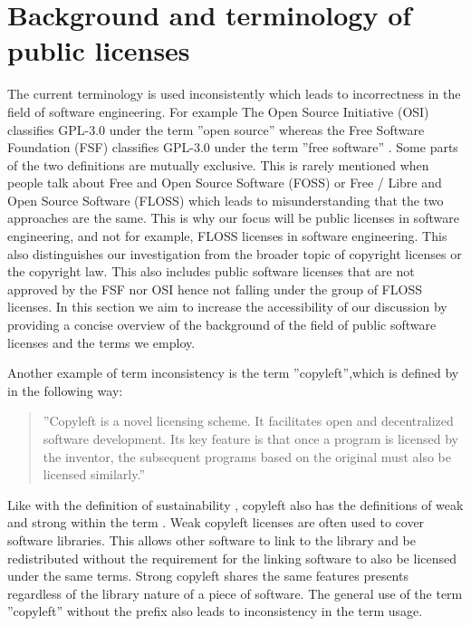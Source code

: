\section{Background and terminology of public licenses\label{sec:bg}}
The current terminology is used inconsistently which leads to incorrectness in the field of software engineering. For example The Open Source Initiative (OSI) classifies GPL-3.0 under the term ''open source'' whereas the Free Software Foundation (FSF) classifies GPL-3.0 under the term ''free software'' \citep{osi:gplv3}\citep{rms:opensource}. Some parts of the two definitions are mutually exclusive. This is rarely mentioned when people talk about Free and Open Source Software (FOSS) or Free / Libre and Open Source Software (FLOSS) which leads to misunderstanding that the two approaches are the same. This is why our focus will be public licenses in software engineering, and not for example, FLOSS licenses in software engineering. This also distinguishes our investigation from the broader topic of copyright licenses or the copyright law. This also includes public software licenses that are not approved by the FSF nor OSI hence not falling under the group of FLOSS licenses. In this section we aim to increase the accessibility of our discussion by providing a concise overview of the background of the field of public software licenses and the terms we employ.

Another example of term inconsistency is the term ''copyleft'',which is defined by \cite{mustonen2003} in the following way:
\begin{quote}
	''Copyleft is a novel licensing scheme. It facilitates open and decentralized software development. Its key feature is that once a program is licensed by the inventor, the subsequent programs based on the original must also be licensed similarly.''
\end{quote}
Like with the definition of sustainability \citep{weak-sustainability}, copyleft also has the definitions of weak and strong within the term \citep{wikipedia:copyleft}. Weak copyleft licenses are often used to cover software libraries. This allows other software to link to the library and be redistributed without the requirement for the linking software to also be licensed under the same terms. Strong copyleft shares the same features \cite{mustonen2003} presents regardless of the library nature of a piece of software. The general use of the term ''copyleft'' without the prefix also leads to inconsistency in the term usage.

